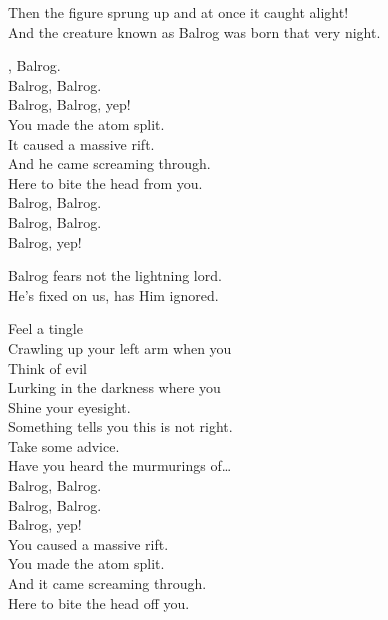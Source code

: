 Then the figure sprung up and at once it caught alight! \\
And the creature known as Balrog was born that very night. \\





, Balrog. \\
Balrog, Balrog. \\
Balrog, Balrog, yep! \\

You made the atom split. \\
It caused a massive rift. \\
And he came screaming through. \\
Here to bite the head from you. \\

Balrog, Balrog. \\
Balrog, Balrog. \\
Balrog, yep! \\


Balrog fears not the lightning lord. \\
He's fixed on us, has Him ignored. \\


Feel a tingle \\
Crawling up your left arm when you \\
Think of evil \\
Lurking in the darkness where you \\
Shine your eyesight. \\
Something tells you this is not right. \\
Take some advice. \\
Have you heard the murmurings of… \\

Balrog, Balrog. \\
Balrog, Balrog. \\
Balrog, yep! \\

You caused a massive rift. \\
You made the atom split. \\
And it came screaming through. \\
Here to bite the head off you. \\

